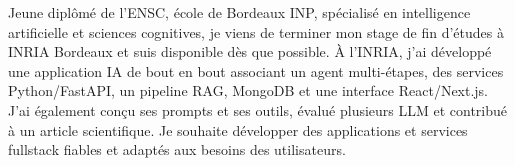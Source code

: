 
\begin{cvparagraph}
Jeune diplômé de l’ENSC, école de Bordeaux INP, spécialisé en intelligence artificielle et sciences cognitives, je viens de terminer mon stage de fin d’études à INRIA Bordeaux et suis disponible dès que possible. À l’INRIA, j’ai développé une application IA de bout en bout associant un agent multi-étapes, des services Python/FastAPI, un pipeline RAG, MongoDB et une interface React/Next.js. J’ai également conçu ses prompts et ses outils, évalué plusieurs LLM et contribué à un article scientifique. Je souhaite développer des applications et services fullstack fiables et adaptés aux besoins des utilisateurs.
\end{cvparagraph}

